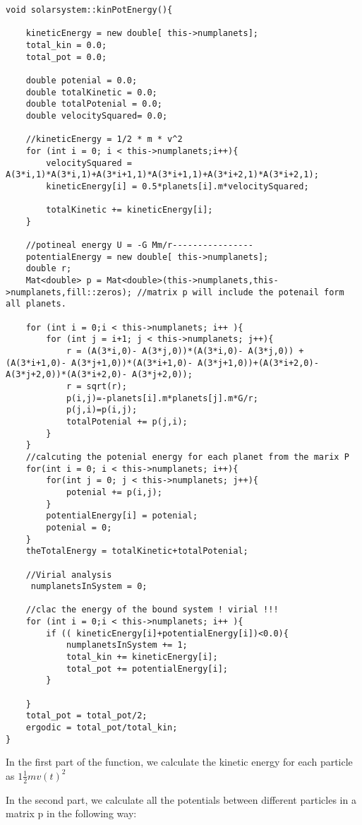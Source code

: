 \documentclass[10pt,a4paper]{article}
\begin{document}
\begin{lstlisting}
void solarsystem::kinPotEnergy(){

    kineticEnergy = new double[ this->numplanets];
    total_kin = 0.0;
    total_pot = 0.0;

    double potenial = 0.0;
    double totalKinetic = 0.0;
    double totalPotenial = 0.0;
    double velocitySquared= 0.0;

    //kineticEnergy = 1/2 * m * v^2
    for (int i = 0; i < this->numplanets;i++){
        velocitySquared = A(3*i,1)*A(3*i,1)+A(3*i+1,1)*A(3*i+1,1)+A(3*i+2,1)*A(3*i+2,1);
        kineticEnergy[i] = 0.5*planets[i].m*velocitySquared;

        totalKinetic += kineticEnergy[i];
    }

    //potineal energy U = -G Mm/r----------------
    potentialEnergy = new double[ this->numplanets];
    double r;
    Mat<double> p = Mat<double>(this->numplanets,this->numplanets,fill::zeros); //matrix p will include the potenail form all planets.

    for (int i = 0;i < this->numplanets; i++ ){
        for (int j = i+1; j < this->numplanets; j++){
            r = (A(3*i,0)- A(3*j,0))*(A(3*i,0)- A(3*j,0)) + (A(3*i+1,0)- A(3*j+1,0))*(A(3*i+1,0)- A(3*j+1,0))+(A(3*i+2,0)- A(3*j+2,0))*(A(3*i+2,0)- A(3*j+2,0));
            r = sqrt(r);
            p(i,j)=-planets[i].m*planets[j].m*G/r;
            p(j,i)=p(i,j);
            totalPotenial += p(j,i);
        }
    }
    //calcuting the potenial energy for each planet from the marix P
    for(int i = 0; i < this->numplanets; i++){
        for(int j = 0; j < this->numplanets; j++){
            potenial += p(i,j);
        }
        potentialEnergy[i] = potenial;
        potenial = 0;
    }
    theTotalEnergy = totalKinetic+totalPotenial;

    //Virial analysis
     numplanetsInSystem = 0;

    //clac the energy of the bound system ! virial !!!
    for (int i = 0;i < this->numplanets; i++ ){
        if (( kineticEnergy[i]+potentialEnergy[i])<0.0){
            numplanetsInSystem += 1;
            total_kin += kineticEnergy[i];
            total_pot += potentialEnergy[i];
        }

    }
    total_pot = total_pot/2;
    ergodic = total_pot/total_kin;
}
\end{lstlisting}
In the first part of the function, we calculate the kinetic energy for each particle as $1 \frac{1}{2}m v(t)^2 $

In the second part, we calculate all the potentials between different particles in a matrix p in the following way:
 
\end{document}
